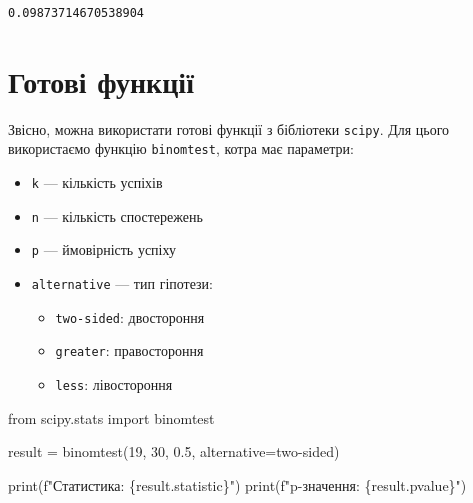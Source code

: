 \documentclass[
  letterpaper,
  10pt,
  openany]{report}
\newenvironment{Shaded}{\begin{snugshade}}{\end{snugshade}}
\newcommand{\BuiltInTok}[1]{\textcolor[rgb]{0.00,0.23,0.31}{#1}}
\newcommand{\DecValTok}[1]{\textcolor[rgb]{0.68,0.00,0.00}{#1}}
\newcommand{\FloatTok}[1]{\textcolor[rgb]{0.68,0.00,0.00}{#1}}
\newcommand{\ImportTok}[1]{\textcolor[rgb]{0.00,0.46,0.62}{#1}}
\newcommand{\NormalTok}[1]{\textcolor[rgb]{0.00,0.23,0.31}{#1}}
\newcommand{\OperatorTok}[1]{\textcolor[rgb]{0.37,0.37,0.37}{#1}}
\newcommand{\SpecialCharTok}[1]{\textcolor[rgb]{0.37,0.37,0.37}{#1}}
\newcommand{\SpecialStringTok}[1]{\textcolor[rgb]{0.13,0.47,0.30}{#1}}
\newcommand{\StringTok}[1]{\textcolor[rgb]{0.13,0.47,0.30}{#1}}
\providecommand{\tightlist}{%
  \setlength{\itemsep}{0pt}\setlength{\parskip}{0pt}}\usepackage{longtable,booktabs,array}
\theoremstyle{definition}
\theoremstyle{remark}
\begin{document}
\begin{verbatim}
0.09873714670538904
\end{verbatim}

\section{Готові
функції}\label{ux433ux43eux442ux43eux432ux456-ux444ux443ux43dux43aux446ux456ux457}

Звісно, можна використати готові функції з бібліотеки \texttt{scipy}.
Для цього використаємо функцію \texttt{binomtest}, котра має параметри:

\begin{itemize}
\tightlist
\item
  \texttt{k} --- кількість успіхів
\item
  \texttt{n} --- кількість спостережень
\item
  \texttt{p} --- ймовірність успіху
\item
  \texttt{alternative} --- тип гіпотези:

  \begin{itemize}
  \tightlist
  \item
    \texttt{two-sided}: двостороння
  \item
    \texttt{greater}: правостороння
  \item
    \texttt{less}: лівостороння
  \end{itemize}
\end{itemize}

\begin{Shaded}
\begin{Highlighting}[]
\ImportTok{from}\NormalTok{ scipy.stats }\ImportTok{import}\NormalTok{ binomtest}

\NormalTok{result }\OperatorTok{=}\NormalTok{ binomtest(}\DecValTok{19}\NormalTok{, }\DecValTok{30}\NormalTok{, }\FloatTok{0.5}\NormalTok{, alternative}\OperatorTok{=}\StringTok{\textquotesingle{}two{-}sided\textquotesingle{}}\NormalTok{)}

\BuiltInTok{print}\NormalTok{(}\SpecialStringTok{f"Статистика: }\SpecialCharTok{\{}\NormalTok{result}\SpecialCharTok{.}\NormalTok{statistic}\SpecialCharTok{\}}\SpecialStringTok{"}\NormalTok{)}
\BuiltInTok{print}\NormalTok{(}\SpecialStringTok{f"p{-}значення: }\SpecialCharTok{\{}\NormalTok{result}\SpecialCharTok{.}\NormalTok{pvalue}\SpecialCharTok{\}}\SpecialStringTok{"}\NormalTok{)}
\end{Highlighting}
\end{Shaded}
\end{document}
